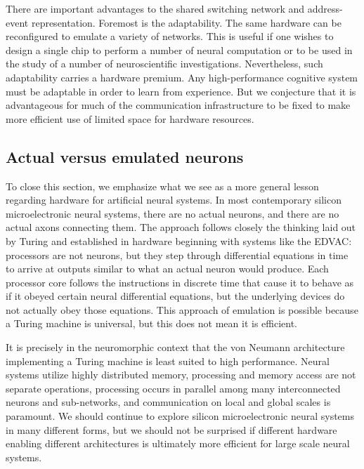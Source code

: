 \documentclass[twocolumn]{article}
\begin{document}
There are important advantages to the shared switching network and address-event representation. Foremost is the adaptability. The same hardware can be reconfigured to emulate a variety of networks. This is useful if one wishes to design a single chip to perform a number of neural computation or to be used in the study of a number of neuroscientific investigations. Nevertheless, such adaptability carries a hardware premium. Any high-performance cognitive system must be adaptable in order to learn from experience. But we conjecture that it is advantageous for much of the communication infrastructure to be fixed to make more efficient use of limited space for hardware resources.

\subsection{Actual versus emulated neurons}
To close this section, we emphasize what we see as a more general lesson regarding hardware for artificial neural systems. In most contemporary silicon microelectronic neural systems, there are no actual neurons, and there are no actual axons connecting them. The approach follows closely the thinking laid out by Turing and established in hardware beginning with systems like the EDVAC: processors are not neurons, but they step through differential equations in time to arrive at outputs similar to what an actual neuron would produce. Each processor core follows the instructions in discrete time that cause it to behave as if it obeyed certain neural differential equations, but the underlying devices do not actually obey those equations. This approach of emulation is possible because a Turing machine is universal, but this does not mean it is efficient. 

It is precisely in the neuromorphic context that the von Neumann architecture implementing a Turing machine is least suited to high performance. Neural systems utilize highly distributed memory, processing and memory access are not separate operations, processing occurs in parallel among many interconnected neurons and sub-networks, and communication on local and global scales is paramount. We should continue to explore silicon microelectronic neural systems in many different forms, but we should not be surprised if different hardware enabling different architectures is ultimately more efficient for large scale neural systems. 
\end{document}
